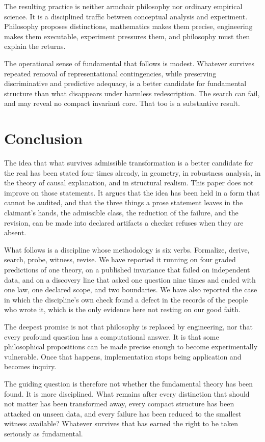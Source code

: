\documentclass[11pt]{article}
\theoremstyle{remark}
\begin{document}
The resulting practice is neither armchair philosophy nor ordinary empirical
science. It is a disciplined traffic between conceptual analysis and experiment.
Philosophy proposes distinctions, mathematics makes them precise, engineering makes
them executable, experiment pressures them, and philosophy must then explain the
returns.

The operational sense of fundamental that follows is modest. Whatever survives
repeated removal of representational contingencies, while preserving discriminative
and predictive adequacy, is a better candidate for fundamental structure than what
disappears under harmless redescription. The search can fail, and may reveal no
compact invariant core. That too is a substantive result.

\section{Conclusion}

The idea that what survives admissible transformation is a better candidate for the
real has been stated four times already, in geometry, in robustness analysis, in the
theory of causal explanation, and in structural realism. This paper does not improve
on those statements. It argues that the idea has been held in a form that cannot be
audited, and that the three things a prose statement leaves in the claimant's hands,
the admissible class, the reduction of the failure, and the revision, can be made
into declared artifacts a checker refuses when they are absent.

What follows is a discipline whose methodology is six verbs. Formalize, derive,
search, probe, witness, revise. We have reported it running on four graded
predictions of one theory, on a published invariance that failed on independent
data, and on a discovery line that asked one question nine times and ended with one
law, one declared scope, and two boundaries. We have also reported the case in which
the discipline's own check found a defect in the records of the people who wrote it,
which is the only evidence here not resting on our good faith.

The deepest promise is not that philosophy is replaced by engineering, nor that
every profound question has a computational answer. It is that some philosophical
propositions can be made precise enough to become experimentally vulnerable. Once
that happens, implementation stops being application and becomes inquiry.

The guiding question is therefore not whether the fundamental theory has been found.
It is more disciplined. What remains after every distinction that should not matter
has been transformed away, every compact structure has been attacked on unseen data,
and every failure has been reduced to the smallest witness available? Whatever
survives that has earned the right to be taken seriously as fundamental.
\end{document}
